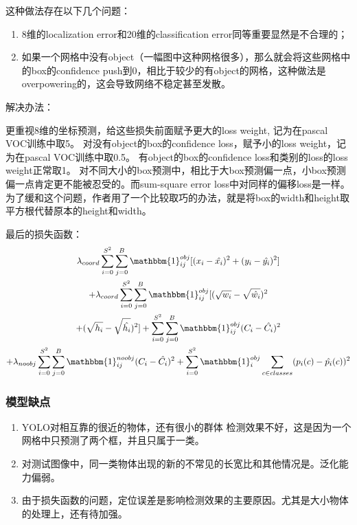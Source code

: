 \documentclass[openany]{ctexbook}
\begin{document}
这种做法存在以下几个问题：
\begin{enumerate}
  \item 8维的localization error和20维的classification error同等重要显然是不合理的；
  \item 如果一个网格中没有object（一幅图中这种网格很多），那么就会将这些网格中的box的confidence push到0，相比于较少的有object的网格，这种做法是overpowering的，这会导致网络不稳定甚至发散。
\end{enumerate}
解决办法：

更重视8维的坐标预测，给这些损失前面赋予更大的loss weight, 记为在pascal VOC训练中取5。
对没有object的box的confidence loss，赋予小的loss weight，记为在pascal VOC训练中取0.5。
有object的box的confidence loss和类别的loss的loss weight正常取1。
对不同大小的box预测中，相比于大box预测偏一点，小box预测偏一点肯定更不能被忍受的。而sum-square error loss中对同样的偏移loss是一样。
为了缓和这个问题，作者用了一个比较取巧的办法，就是将box的width和height取平方根代替原本的height和width。

最后的损失函数：
\begin{multline}
  \lambda_{coord}\sum_{i=0}^{S^2}\sum_{j=0}^{B}\mathbbm{1}^{obj}_{ij}[(x_i-\hat{x_i})^{2}+(y_i-\hat{y_i})^{2}]\\
  +\lambda_{coord}\sum_{i=0}^{S^2}\sum_{j=0}^{B}\mathbbm{1}^{obj}_{ij}[(\sqrt{w_i}-\sqrt{\hat{w_i}})^{2}\\
  +(\sqrt{h_i}-\sqrt{\hat{h_i}})^{2}]+\sum_{i=0}^{S^2}\sum_{j=0}^{B}\mathbbm{1}^{obj}_{ij}(C_i-\hat{C_i})^{2}\\
  +\lambda_{noobj}\sum_{i=0}^{S^2}\sum_{j=0}^{B}\mathbbm{1}^{noobj}_{ij}(C_i-\hat{C_i})^{2}+\sum_{i=0}^{S^2}\mathbbm{1}^{obj}_{i}\sum_{c \in classes}(p_i(c)-\hat{p_i}(c))^2
  \nonumber
\end{multline}
\subsubsection{模型缺点}
\begin{enumerate}
  \item YOLO对相互靠的很近的物体，还有很小的群体 检测效果不好，这是因为一个网格中只预测了两个框，并且只属于一类。
  \item 对测试图像中，同一类物体出现的新的不常见的长宽比和其他情况是。泛化能力偏弱。
  \item 由于损失函数的问题，定位误差是影响检测效果的主要原因。尤其是大小物体的处理上，还有待加强。
\end{enumerate}
\end{document}
